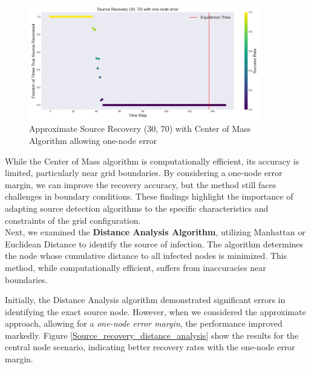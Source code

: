 \begin{figure}[H]
\centering
\includegraphics[width=0.9\textwidth]{img/approx_source_recovery_30_70_Center_of_Mass.png}
\caption{Approximate Source Recovery (30, 70) with Center of Mass Algorithm allowing one-node error}
\label{approx_source_recovery_30_70_Center_of_Mass}
\end{figure}

While the Center of Mass algorithm is computationally efficient, its accuracy is limited, particularly near grid boundaries. By considering a one-node error margin, we can improve the recovery accuracy, but the method still faces challenges in boundary conditions. These findings highlight the importance of adapting source detection algorithms to the specific characteristics and constraints of the grid configuration.\\

Next, we examined the \textbf{Distance Analysis Algorithm}, utilizing Manhattan or Euclidean Distance to identify the source of infection. The algorithm determines the node whose cumulative distance to all infected nodes is minimized. This method, while computationally efficient, suffers from inaccuracies near boundaries.

Initially, the Distance Analysis algorithm demonstrated significant errors in identifying the exact source node. However, when we considered the approximate approach, allowing for a \textit{one-node error margin}, the performance improved markedly. Figure \ref{Source_recovery_distance_analysis} show the results for the central node scenario, indicating better recovery rates with the one-node error margin.

